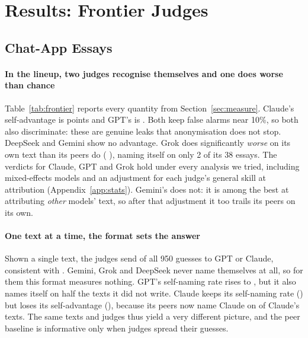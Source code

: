 \section{Results: Frontier Judges}
\label{sec:frontier}

\subsection{Chat-App Essays}



\paragraph{In the lineup, two judges recognise themselves and one does worse
than chance} Table~\ref{tab:frontier} reports every quantity from
Section~\ref{sec:measure}. Claude's self-advantage is \ClaudeAdvLineup{}
points \ClaudeAdvLineupCI{} and GPT's is \GPTAdvLineup{} \GPTAdvLineupCI{}.
Both keep false alarms near 10\%, so both also discriminate: these are genuine
leaks that anonymisation does not stop. DeepSeek and Gemini show no
advantage. Grok does significantly \emph{worse} on its own text than its peers
do (\GrokAdvLineup{} \GrokAdvLineupCI{}), naming itself on only 2 of its 38
essays. The verdicts for Claude, GPT and Grok hold under every analysis we
tried, including mixed-effects models and an adjustment for each judge's
general skill at attribution (Appendix~\ref{app:stats}). Gemini's does not:
it is among the best at attributing \emph{other} models' text, so after that
adjustment it too trails its peers on its own.

\paragraph{One text at a time, the format sets the answer} Shown a single
text, the judges send \SingleConcentration{} of all 950 guesses to GPT or
Claude, consistent with \citet{bai2025selfrecognition}. Gemini, Grok and
DeepSeek never name themselves at all, so for them this format measures
nothing. GPT's self-naming rate rises to \GPTSelfSingle{}, but it also names
itself on half the texts it did not write. Claude keeps its self-naming rate
(\ClaudeSelfSingle{}) but loses its self-advantage (\ClaudeAdvSingle{}),
because its peers now name Claude on \ClaudePeerSingle{} of Claude's texts.
The same texts and judges thus yield a very different picture, and the peer
baseline is informative only when judges spread their guesses.

